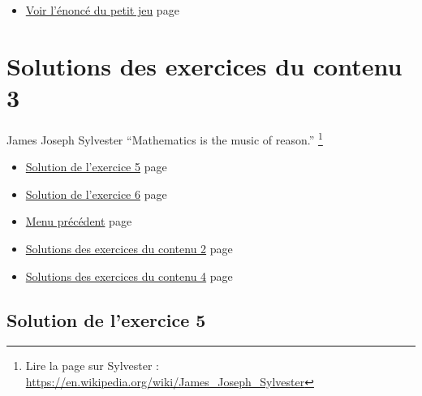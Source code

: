 \documentclass[a4paper,11pt]{book}
\begin{document}
\begin{enumerate}
\begin{itemize}
\item \hyperref[org2b18515]{Voir l'énoncé du petit jeu}
page~\pageref{page:sec2.2.4small-game}
\end{itemize}

\clearpage
\end{enumerate}

\chapter{Solutions des exercices du contenu 3}
\label{sec:org37ba6a5}
\label{org76d02b6}
\label{page:sec8.3sols-cont3}

\begin{myquote}{James Joseph Sylvester}
\enquote{Mathematics is the music of reason.}
\footnote{Lire la page sur Sylvester : \url{https://en.wikipedia.org/wiki/James_Joseph_Sylvester}}
\end{myquote}

\clearpage

\label{orga64a6e6}
\label{page:sols-cont3-menu}
\begin{itemize}
\item \hyperref[orgc2047b6]{Solution de l'exercice 5} page \pageref{page:sec8.3sols-cont3}
\item \hyperref[orge0c2cd7]{Solution de l'exercice 6} page \pageref{page:sec8.3.2sol6}
\item \hyperref[orgd150cd0]{Menu précédent} page \pageref{page:sols-contents-menu}
\item \hyperref[org56f3479]{Solutions des exercices du contenu 2} page \pageref{page:sec8.2sols-cont2}
\item \hyperref[org74bc845]{Solutions des exercices du contenu 4} page \pageref{page:sec8.4sols-cont4}
\end{itemize}

\clearpage

\section{Solution de l'exercice 5}
\label{sec:orgc66cd0b}
\label{orgc2047b6}
\label{page:sec8.3.1sol5}
\end{document}
